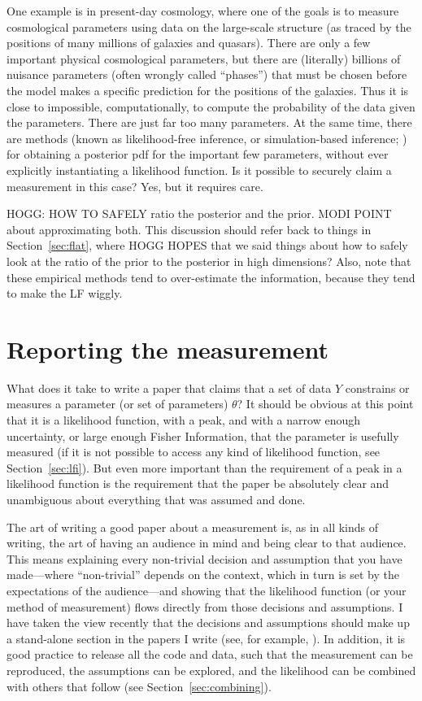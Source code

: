 \documentclass{article}
\newcommand{\sectionname}{Section}
\newcommand{\secref}[1]{\sectionname~\ref{#1}}
\begin{document}
One example is in present-day cosmology, where one of the goals is to measure cosmological parameters using data on the large-scale structure (as traced by the positions of many millions of galaxies and quasars).
There are only a few important physical cosmological parameters, but there are (literally) billions of nuisance parameters (often wrongly called ``phases'') that must be chosen before the model makes a specific prediction for the positions of the galaxies.
Thus it is close to impossible, computationally, to compute the probability of the data given the parameters.
There are just far too many parameters.
At the same time, there are methods (known as likelihood-free inference, or simulation-based inference; \cite{abc, sbi}) for obtaining a posterior pdf for the important few parameters, without ever explicitly instantiating a likelihood function.
Is it possible to securely claim a measurement in this case?
Yes, but it requires care.

HOGG: HOW TO SAFELY ratio the posterior and the prior. MODI POINT about approximating both.
This discussion should refer back to things in \secref{sec:flat}, where HOGG HOPES that we said things about how to safely look at the ratio of the prior to the posterior in high dimensions?
Also, note that these empirical methods tend to over-estimate the information, because they tend to make the LF wiggly.

\section{Reporting the measurement}\label{sec:reporting}
What does it take to write a paper that claims that a set of data $Y$ constrains or measures a parameter (or set of parameters) $\theta$?
It should be obvious at this point that it is a likelihood function, with a peak, and with a narrow enough uncertainty, or large enough Fisher Information, that the parameter is usefully measured
(if it is not possible to access any kind of likelihood function, see \secref{sec:lfi}).
But even more important than the requirement of a peak in a likelihood function is the requirement that the paper be absolutely clear and unambiguous about everything that was assumed and done.

The art of writing a good paper about a measurement is, as in all kinds of writing, the art of having an audience in mind and being clear to that audience.
This means explaining every non-trivial decision and assumption that you have made---where ``non-trivial'' depends on the context, which in turn is set by the expectations of the audience---and showing that the likelihood function (or your method of measurement) flows directly from those decisions and assumptions.
I have taken the view recently that the decisions and assumptions should make up a stand-alone section in the papers I write (see, for example, \cite{frizzle}).
In addition, it is good practice to release all the code and data, such that the measurement can be reproduced, the assumptions can be explored, and the likelihood can be combined with others that follow (see \secref{sec:combining}).
\end{document}

